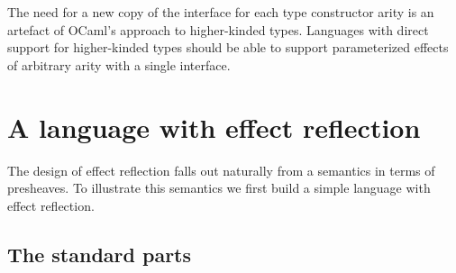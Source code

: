 \documentclass[acmsmall, screen, nonacm]{acmart}
\theoremstyle{definition}
\begin{document}
The need for a new copy of the interface for each type constructor arity
is an artefact of OCaml's approach to higher-kinded types. Languages
with direct support for higher-kinded types should be able to support
parameterized effects of arbitrary arity with a single interface.

\section{A language with effect reflection}
\label{sec:language}

The design of effect reflection falls out naturally from a semantics in
terms of presheaves. To illustrate this semantics we first build a
simple language with effect reflection.

\subsection{The standard parts}
\end{document}
